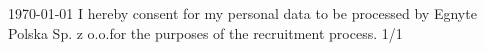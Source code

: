\documentclass[11pt, a4paper]{awesome-cv}
\begin{document}
\makecvheader

\makecvfooter
  {\today}
  {I hereby consent for my personal data to be processed by Egnyte Polska Sp. z o.o.{\break}for the purposes of the recruitment process.}
  {1/1}



\end{document}
